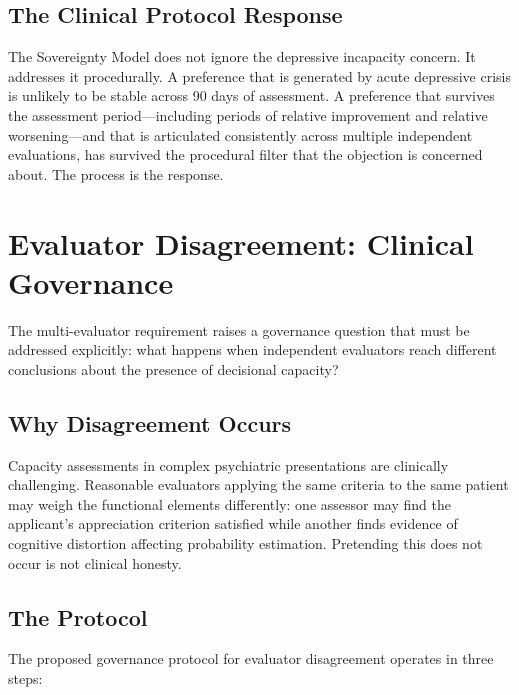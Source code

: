 \documentclass[11pt, letterpaper]{article}
\begin{document}
\subsection{The Clinical Protocol Response}

The Sovereignty Model does not ignore the depressive incapacity concern. It addresses
it procedurally. A preference that is generated by acute depressive crisis is unlikely
to be stable across 90 days of assessment. A preference that survives the assessment
period---including periods of relative improvement and relative worsening---and
that is articulated consistently across multiple independent evaluations, has survived
the procedural filter that the objection is concerned about. The process is the
response.

\section{Evaluator Disagreement: Clinical Governance}

The multi-evaluator requirement raises a governance question that must be addressed
explicitly: what happens when independent evaluators reach different conclusions about
the presence of decisional capacity?

\subsection{Why Disagreement Occurs}

Capacity assessments in complex psychiatric presentations are clinically challenging.
Reasonable evaluators applying the same criteria to the same patient may weigh the
functional elements differently: one assessor may find the applicant's appreciation
criterion satisfied while another finds evidence of cognitive distortion affecting
probability estimation. Pretending this does not occur is not clinical honesty.

\subsection{The Protocol}

The proposed governance protocol for evaluator disagreement operates in three steps:
\end{document}
